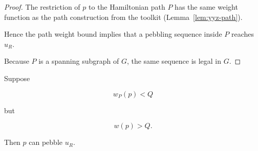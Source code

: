 \begin{proof}

The restriction of $p$ to the Hamiltonian path $P$ has the same
weight function as the path construction from the toolkit
(Lemma~\ref{lem:yyz-path}).

Hence the path weight bound implies that a pebbling sequence inside
$P$ reaches $u_R$.

Because $P$ is a spanning subgraph of $G$, the same sequence is legal
in $G$.

\end{proof}




\begin{lemma}
\label{lem:apex-feed}

Suppose

\[
w_P(p)<Q
\]

but

\[
w(p)>Q .
\]

Then $p$ can pebble $u_R$.

\end{lemma}



